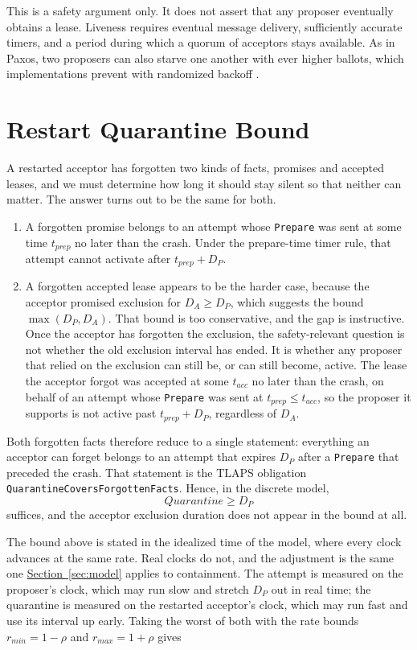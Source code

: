 \documentclass[final,5p,times,twocolumn,number]{elsarticle}
\newcommand{\code}[1]{\texttt{#1}}
\newcommand{\secref}[1]{\hyperref[#1]{Section~\ref*{#1}}}
\begin{document}
This is a safety argument only.  It does not assert that any proposer eventually obtains a lease.  Liveness requires eventual message delivery, sufficiently accurate timers, and a period during which a quorum of acceptors stays available.  As in Paxos, two proposers can also starve one another with ever higher ballots, which implementations prevent with randomized backoff \cite{ref1}.

\section{Restart Quarantine Bound}\label{sec:quarantine}

A restarted acceptor has forgotten two kinds of facts, promises and accepted leases, and we must determine how long it should stay silent so that neither can matter.  The answer turns out to be the same for both.

\begin{enumerate}\itemsep0.25em
\item A forgotten promise belongs to an attempt whose \code{Prepare} was sent at some time $t_{prep}$ no later than the crash.  Under the prepare-time timer rule, that attempt cannot activate after $t_{prep} + D_P$.
\item A forgotten accepted lease appears to be the harder case, because the acceptor promised exclusion for $D_A \geq D_P$, which suggests the bound $\max(D_P, D_A)$.  That bound is too conservative, and the gap is instructive.  Once the acceptor has forgotten the exclusion, the safety-relevant question is not whether the old exclusion interval has ended.  It is whether any proposer that relied on the exclusion can still be, or can still become, active.  The lease the acceptor forgot was accepted at some $t_{acc}$ no later than the crash, on behalf of an attempt whose \code{Prepare} was sent at $t_{prep} \leq t_{acc}$, so the proposer it supports is not active past $t_{prep} + D_P$, regardless of $D_A$.
\end{enumerate}

Both forgotten facts therefore reduce to a single statement: everything an acceptor can forget belongs to an attempt that expires $D_P$ after a \code{Prepare} that preceded the crash.  That statement is the TLAPS obligation \code{QuarantineCoversForgottenFacts}.  Hence, in the discrete model,
\[
  Quarantine \geq D_P
\]
suffices, and the acceptor exclusion duration does not appear in the bound at all.

The bound above is stated in the idealized time of the model, where every clock advances at the same rate.  Real clocks do not, and the adjustment is the same one \secref{sec:model} applies to containment.  The attempt is measured on the proposer's clock, which may run slow and stretch $D_P$ out in real time; the quarantine is measured on the restarted acceptor's clock, which may run fast and use its interval up early.  Taking the worst of both with the rate bounds $r_{min} = 1-\rho$ and $r_{max} = 1+\rho$ gives
\end{document}
